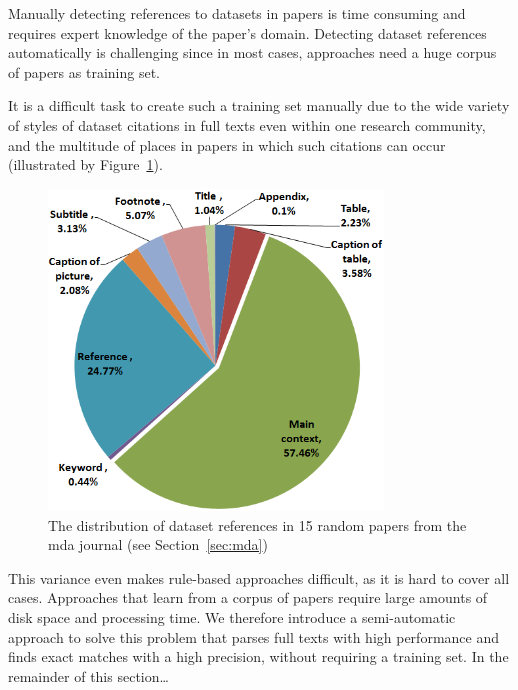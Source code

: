 \documentclass{IOS-Book-Article}
\begin{document}
Manually detecting references to datasets in papers is time consuming and requires expert knowledge of the paper's domain. 
Detecting dataset references automatically is challenging since in most cases, approaches need a huge corpus of papers as training set. 

It is a difficult task to create such a training set manually due to the wide variety of styles of dataset citations in full texts even within one research community, and the multitude of places in papers in which such citations can occur (illustrated by Figure~\ref{fig:places-example}).

\begin{figure}[h]
	\centering
	\includegraphics[width=3.5in]{DistPlaces3.PNG} 
	\caption{The distribution of dataset references in 15 random papers from the mda journal (see Section~\ref{sec:mda})}
	\label{fig:places-example}
\end{figure}

This variance even makes rule-based approaches difficult, as it is hard to cover all cases. 
Approaches that learn from a corpus of papers require large amounts of disk space and processing time.
We therefore introduce a semi-automatic approach to solve this problem that parses full texts with high performance and finds exact matches with a high precision, without requiring a training set. 
In the remainder of this section\dots {} 
\end{document}

